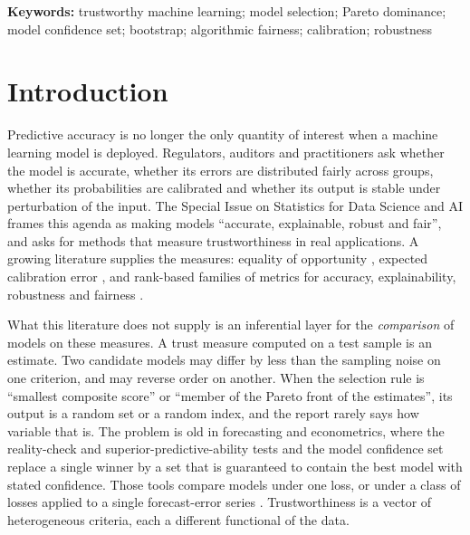 \documentclass[11pt,a4paper]{article}
\begin{document}
\begin{abstract}
\end{abstract}

\noindent\textbf{Keywords:} trustworthy machine learning; model selection; Pareto dominance; model confidence set; bootstrap; algorithmic fairness; calibration; robustness

\section{Introduction}
Predictive accuracy is no longer the only quantity of interest when a machine learning model is deployed. Regulators, auditors and practitioners ask whether the model is accurate, whether its errors are distributed fairly across groups, whether its probabilities are calibrated and whether its output is stable under perturbation of the input. The Special Issue on Statistics for Data Science and AI frames this agenda as making models ``accurate, explainable, robust and fair'', and asks for methods that measure trustworthiness in real applications. A growing literature supplies the measures: equality of opportunity \citep{hardt2016}, expected calibration error \citep{guo2017}, and rank-based families of metrics for accuracy, explainability, robustness and fairness \citep{giudici2024robust,babaei2025rgb,wu2026safe}.

What this literature does not supply is an inferential layer for the \emph{comparison} of models on these measures. A trust measure computed on a test sample is an estimate. Two candidate models may differ by less than the sampling noise on one criterion, and may reverse order on another. When the selection rule is ``smallest composite score'' or ``member of the Pareto front of the estimates'', its output is a random set or a random index, and the report rarely says how variable that is. The problem is old in forecasting and econometrics, where the reality-check and superior-predictive-ability tests \citep{white2000,hansen2005spa} and the model confidence set \citep{hansen2011mcs} replace a single winner by a set that is guaranteed to contain the best model with stated confidence. Those tools compare models under one loss, or under a class of losses applied to a single forecast-error series \citep{arvanitis2021,jin2017}. Trustworthiness is a vector of heterogeneous criteria, each a different functional of the data.
\end{document}
